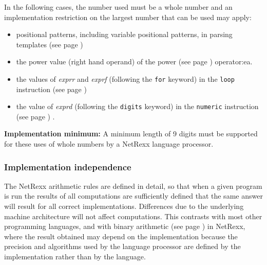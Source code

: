 In the following cases, the number used must be a whole number and
an implementation restriction on the largest number that can be used
may apply:
\begin{itemize}
\item positional patterns, including variable positional patterns,
in  parsing templates (see page \pageref{refparsing}) 
\item the power value (right hand operand) of the  power (see page \pageref{refpower}) 
operator:ea.
\item the values of \emph{exprr} and \emph{exprf} (following the
\texttt{for} keyword) in the  \texttt{loop} instruction (see page \pageref{refloop}) 
\item the value of \emph{exprd} (following the \texttt{digits}
keyword) in the  \texttt{numeric} instruction (see page \pageref{refnumeric}) .
\end{itemize}
 \textbf{Implementation minimum:} A minimum length of 9 digits must
be supported for these uses of whole numbers by a NetRexx language
processor.
\subsubsection{Implementation independence}
 The NetRexx arithmetic rules are defined in detail, so that when a
given program is run the results of all computations are sufficiently
defined that the same answer will result for all correct
implementations.  Differences due to the underlying machine
architecture will not affect computations.
 This contrasts with most other programming languages, and with
 binary arithmetic (see page \pageref{refbinary})  in NetRexx, where the
result obtained may depend on the implementation because the precision
and algorithms used by the language processor are defined by the
implementation rather than by the language.
